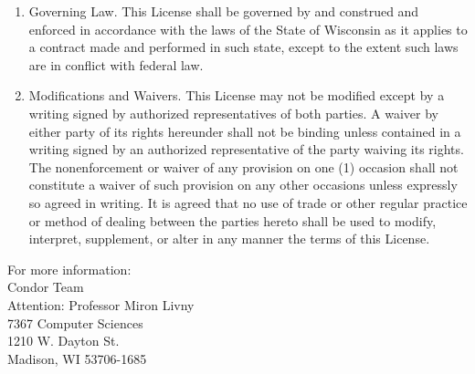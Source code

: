 \begin{enumerate}
\item Governing Law.  This License shall be governed by and construed and enforced in accordance with the laws of the State of Wisconsin as it applies to a contract made and performed in such state, except to the extent such laws are in conflict with federal law.

\item Modifications and Waivers.  This License may not be modified
except by a writing signed by authorized representatives of both
parties.  A waiver by either party of its rights hereunder shall not
be binding unless contained in a writing signed by an authorized
representative of the party waiving its rights.  The nonenforcement or
waiver of any provision on one (1) occasion shall not constitute a
waiver of such provision on any other occasions unless expressly so
agreed in writing.  It is agreed that no use of trade or other regular
practice or method of dealing between the parties hereto shall be used
to modify, interpret, supplement, or alter in any manner the terms of
this License.

\end{enumerate}


\begin{flushleft}
For more information: \\

Condor Team \\
Attention: Professor Miron Livny \\
7367 Computer Sciences \\ 
1210 W. Dayton St. \\
Madison, WI 53706-1685 \\
 \\
 \\
\end{flushleft}



